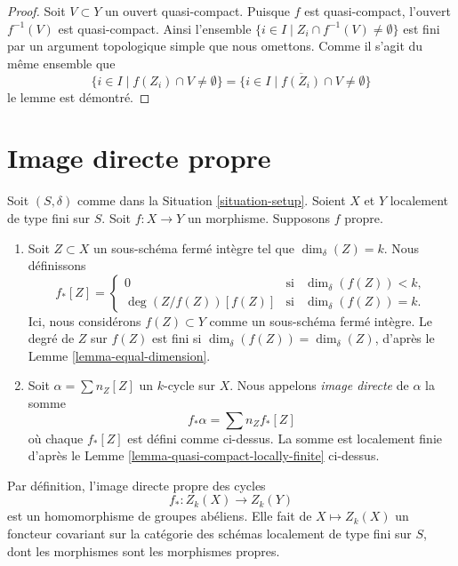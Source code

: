 \begin{proof}
Soit $V \subset Y$ un ouvert quasi-compact.
Puisque $f$ est quasi-compact, l'ouvert $f^{-1}(V)$ est
quasi-compact. Ainsi l'ensemble
$\{i \in I \mid Z_i \cap f^{-1}(V) \not = \emptyset \}$
est fini par un argument topologique simple que nous omettons.
Comme il s'agit du même ensemble que
$$
\{i \in I \mid f(Z_i) \cap V \not = \emptyset \} =
\{i \in I \mid \overline{f(Z_i)} \cap V \not = \emptyset \}
$$
le lemme est démontré.
\end{proof}









\section{Image directe propre}
\label{section-proper-pushforward}

\begin{definition}
\label{definition-proper-pushforward}
Soit $(S, \delta)$ comme dans la Situation \ref{situation-setup}.
Soient $X$ et $Y$ localement de type fini sur $S$.
Soit $f : X \to Y$ un morphisme.
Supposons $f$ propre.
\begin{enumerate}
\item Soit $Z \subset X$ un sous-schéma fermé intègre
tel que $\dim_\delta(Z) = k$. Nous définissons
$$
f_*[Z] =
\left\{
\begin{matrix}
0 & \text{si} & \dim_\delta(f(Z))< k, \\
\deg(Z/f(Z)) [f(Z)] & \text{si} & \dim_\delta(f(Z)) = k.
\end{matrix}
\right.
$$
Ici, nous considérons $f(Z) \subset Y$ comme un sous-schéma fermé intègre.
Le degré de $Z$ sur $f(Z)$ est fini si
$\dim_\delta(f(Z)) = \dim_\delta(Z)$,
d'après le Lemme \ref{lemma-equal-dimension}.
\item Soit $\alpha = \sum n_Z [Z]$ un $k$-cycle sur $X$. Nous appelons
{\it image directe} de $\alpha$ la somme
$$
f_* \alpha = \sum n_Z f_*[Z]
$$
où chaque $f_*[Z]$ est défini comme ci-dessus. La somme est localement finie
d'après le Lemme \ref{lemma-quasi-compact-locally-finite} ci-dessus.
\end{enumerate}
\end{definition}

\noindent
Par définition, l'image directe propre des cycles
$$
f_* : Z_k(X) \longrightarrow Z_k(Y)
$$
est un homomorphisme de groupes abéliens. Elle fait de $X \mapsto Z_k(X)$
un foncteur covariant sur la catégorie des schémas localement
de type fini sur $S$, dont les morphismes sont les morphismes propres.

